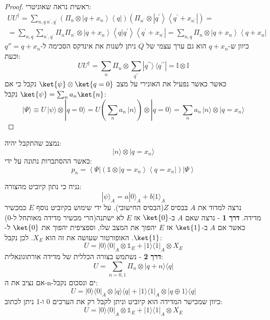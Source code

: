 \documentclass{tstextbook}
\begin{document}
\begin{proof}
ראשית נראה שאוניטרי:
\begin{gather*}U U^{\dagger}=\!\!\!\sum_{n,q\ n^{\prime},q^{\prime}}\left(\Pi_{n}\otimes\left|q+x_{n}\right\rangle\left\langle q\right|\right)\left(\Pi_{n^{\prime}}\otimes\left|q^{\prime}\right\rangle\left\langle q^{\prime}+x_{n^{\prime}}\right|\right)=\\=\sum_{n,q}\sum_{n^{\prime},q^{\prime}}\Pi_{n}\Pi_{n^{\prime}}\otimes\left|q+x_{n}\right\rangle\left\langle q|q^{\prime}\right\rangle\left\langle q^{\prime}+x_{n^{\prime}}\right|=\sum_{n,q}\Pi_{n}\otimes\left|q+x_{n}\right\rangle\left\langle q+x_{n}\right| 
\end{gather*}
כיוון ש-\(q+x_{n}\) הוא גם ערך עצמי של \(Q\) ניתן לשנות את אינדקס הסכימה ל-\(q''=q+x_{n}\) וכעת:
$$U U^{\dagger}=\sum_{n}\Pi_{n}\otimes\sum_{q^{\prime\prime}}|q^{\prime\prime}\rangle\,\langle q^{\prime\prime}|=\mathbb{I}\otimes\mathbb{I}$$
כאשר כאשר נפעיל את האונירי על מצב \(\ket{\psi}\otimes \ket{q=0}\) נקבל כי אם \(\ket{\psi}=\sum_{n}a_{n}\ket{n}\) נקבל:
$$|\Psi\rangle\equiv U\,|\psi\rangle\!\otimes\!|q=0\rangle=U\left(\sum_{n}a_{n}\,|n\rangle\right)\!\otimes\!|q=0\rangle=\sum_{n}a_{n}\,|n\rangle\!\otimes\!|q=x_{n}\rangle$$

\end{proof}
\begin{corollary}
נמצב שהתקבל יהיה:
$$|n\rangle\otimes|q=x_{n}\rangle$$
כאשר ההסתברות נתונה על ידי:
$$p_{n}=\left\langle\Psi\right|\left(\mathbb{1}\otimes\left|q=x_{n}\right\rangle\left\langle q=x_{n}\right|\right)\left|\Psi\right\rangle$$

\end{corollary}
\begin{example}
נניח כי נתון קיוביט מהצורה:
$$|\psi\rangle_{A}=a|0\rangle_{A}+b|1\rangle_{A}$$
נרצה למדוד את \(A\) בבסיס \(Z\)(הבסיס החישובי). על ידי שימוש בקיוביט נוסף \(E\) כמכשיר מדידה.
\textbf{דרך 1} - נרצה שאם \(A\) ב-\(\ket{0}\) אז \(E\) לא ישתנה(הרי מכשיר מדידה מאותחל ל-0) כאשר אם \(A\) ב-\(\ket{1}\) אז \(E\) יהפוך את המצב שלו, וספציפית יהפוך את \(\ket{0}\) ל-\(\ket{1}\). האופורטור שעושה את זה הוא \(X_{E}\). לכן נקבל:
$$U=|0\rangle\langle0|_{A}\otimes \mathbb{1}_{E}+|1\rangle\langle1|_{A}\otimes X_{E}$$\textbf{דרך 2} - נשתמש בצורה הכללית של מדידה אורתוגונאלית:
$$U=\sum_{n=0,1}\Pi_{n}\otimes|q+n\rangle\langle q|$$
אם נציב את ה-n-ים ונסכום נקבל:
$$U=|0\rangle\langle0|_{A}\otimes|q\rangle\langle q|+|1\rangle\langle1|_{A}\otimes|q\oplus1\rangle\langle q|$$
כיוון שמכישר המדידה הוא קיוביט וניתן לקבל רק את הערכים 0 ו-1 ניתן לכתוב:
$$U=|0\rangle\langle0|_{A}\otimes \mathbb{1}_{E}+|1\rangle\langle1|_{A}\otimes X_{E}$$

\end{example}
\end{document}
